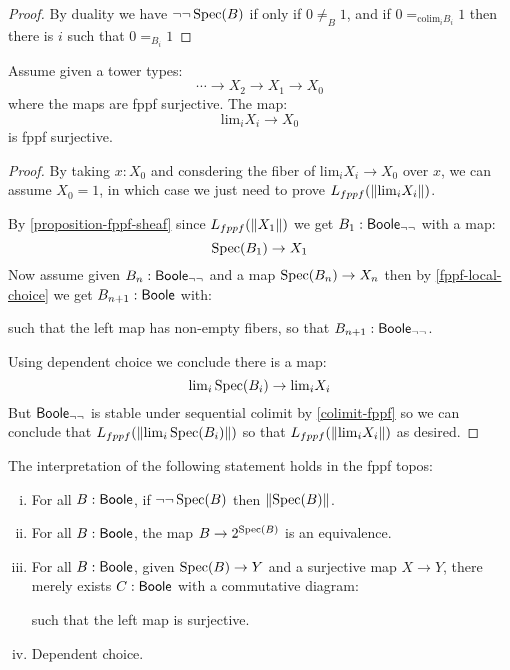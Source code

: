 \begin{proof}
By duality we have $\neg\neg\operatorname{Spec}(B)$ if only if $0\not=_B1$, and if $0=_{\mathrm{colim}_iB_i}1$ then there is $i$ such that $0=_{B_i}1$
\end{proof}

\begin{lemma}\label{dependent-choice-fppf}
Assume given a tower types:
\[\cdots \to X_2\to X_1 \to X_0 \]
where the maps are fppf surjective. The map:
\[\mathrm{lim}_i X_i\to X_0\]
is fppf surjective.
\end{lemma}

\begin{proof}
By taking $x:X_0$ and consdering the fiber of $\mathrm{lim}_i X_i\to X_0$ over $x$, we can assume $X_0=1$, in which case we just need to prove $L_{fppf}(\lVert \mathrm{lim}_iX_i \rVert)$.

By \cref{proposition-fppf-sheaf} since $L_{fppf}(\lVert X_1 \rVert)$ we get $B_1:\mathsf{Boole}_{\neg\neg}$ with a map:
\[\operatorname{Spec}(B_1)\to X_1\]
Now assume given $B_n:\mathsf{Boole}_{\neg\neg}$ and a map $\operatorname{Spec}(B_n)\to X_n$ then by \cref{fppf-local-choice} we get $B_{n+1}:\mathsf{Boole}$ with:
\begin{center}
\end{center}
such that the left map has non-empty fibers, so that $B_{n+1}:\mathsf{Boole}_{\neg\neg}$.

Using dependent choice we conclude there is a map:
\[\mathrm{lim}_i\operatorname{Spec}(B_i) \to \mathrm{lim}_iX_i\]
But $\mathsf{Boole}_{\neg\neg}$ is stable under sequential colimit by \cref{colimit-fppf} so we can conclude that $L_{fppf}(\lVert \mathrm{lim}_i\operatorname{Spec}(B_i) \rVert)$ so that $L_{fppf}(\lVert \mathrm{lim}_iX_i \rVert)$ as desired.
\end{proof}

\begin{theorem}
The interpretation of the following statement holds in the fppf topos:
\begin{enumerate}[(i)]
\item For all $B:\mathsf{Boole}$, if $\neg\neg\operatorname{Spec}(B)$ then $\lVert \operatorname{Spec}(B) \rVert$.
\item For all $B:\mathsf{Boole}$, the map $B\to {2}^{\operatorname{Spec}(B)}$ is an equivalence.
\item For all $B:\mathsf{Boole}$, given $\operatorname{Spec}(B)\to Y$ and a surjective map $X\to Y$, there merely exists $C:\mathsf{Boole}$ with a commutative diagram:
\begin{center}
\end{center}
such that the left map is surjective.
\item Dependent choice.
\end{enumerate}
\end{theorem}

